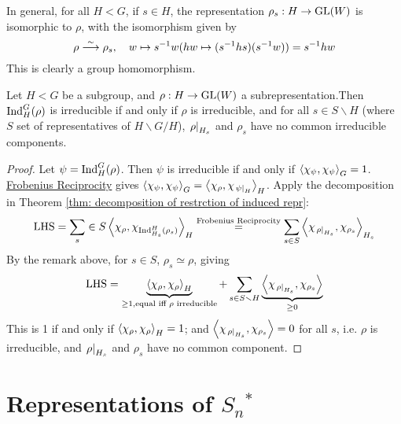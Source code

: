 \documentclass{article}
\begin{document}
\begin{remark}
    In general, for all $H < G$, if $s \in H$, the representation $\rho_s : H \to \mathrm{GL}(W)$ is isomorphic to $\rho$, with the isomorphism given by
    \[
        \rho \overset{\sim}{\longrightarrow} \rho_s, \quad w \mapsto s^{-1}w (hw \mapsto (s^{-1}hs)(s^{-1}w)) = s^{-1} hw
    \]
    This is clearly a group homomorphism.
\end{remark}

\begin{theorem}
    Let $H < G$ be a subgroup, and $\rho: H \to \mathrm{GL}(W)$ a subrepresentation.Then $\mathrm{Ind}_H^G (\rho)$ is irreducible if and only if $\rho$ is irreducible, and for all $s \in S \smallsetminus H$ (where $S$ set of representatives of $H \smallsetminus G / H$), $\left.\rho\right|_{H_s}$ and $\rho_s$ have no common irreducible components.
\end{theorem}

\begin{proof}
    Let $\psi = \mathrm{Ind}_H^G (\rho)$. Then $\psi$ is irreducible if and only if $\left\langle \chi_{\psi}, \chi_{\psi} \right\rangle_G = 1$. \hyperref[thm: Frobenius Reciprocity]{Frobenius Reciprocity} gives $\left\langle \chi_{\psi}, \chi_{\psi} \right\rangle_G = \left\langle \chi_{\rho}, \chi_{\left.\psi\right|_{H}} \right\rangle_H$. Apply the decomposition in Theorem \ref{thm: decomposition of restrction of induced repr}:
    \[
        \text{LHS} = \sum_s \in S \left\langle \chi_{\rho}, \chi_{\mathrm{Ind}_{H_s}^H (\rho_s)} \right\rangle_H \overset{\text{Frobenius Reciprocity}}{=} \sum_{s \in S} \left\langle \chi_{\left.\rho\right|_{H_s}}, \chi_{\rho_s} \right\rangle_{H_s}
    \]
    By the remark above, for $s \in S$, $\rho_s \simeq \rho$, giving
    \[
        \text{LHS} = \underbrace{\left\langle \chi_{\rho}, \chi_{\rho} \right\rangle_H}_{\geq 1, \text{equal iff $\rho$ irreducible}} + \sum_{s \in S \smallsetminus H} \underbrace{\left\langle \chi_{\left.\rho\right|_{H_s}}, \chi_{\rho_s} \right\rangle}_{\geq 0}
    \]
    This is 1 if and only if $\left\langle \chi_{\rho}, \chi_{\rho} \right\rangle_H = 1$; and $\left\langle \chi_{\left.\rho\right|_{H_s}}, \chi_{\rho_s} \right\rangle = 0$ for all $s$, i.e. $\rho$ is irreducible, and $\left.\rho\right|_{H_s}$ and $\rho_s$ have no common component.
\end{proof}

\section{Representations of $S_n$$^{\ast}$}
\end{document}
